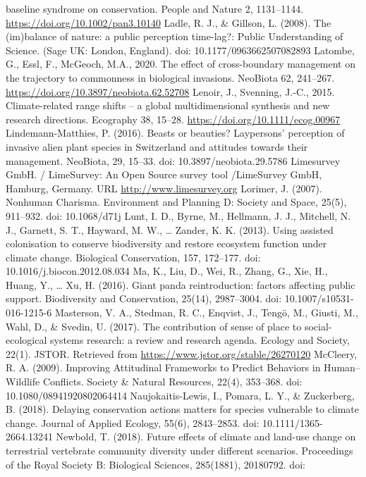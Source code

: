 \documentclass[
]{article}
\begin{document}
baseline syndrome on conservation. People and Nature 2, 1131--1144.
\url{https://doi.org/10.1002/pan3.10140} Ladle, R. J., \& Gillson, L.
(2008). The (im)balance of nature: a public perception time-lag?: Public
Understanding of Science. (Sage UK: London, England). doi:
10.1177/0963662507082893 Latombe, G., Essl, F., McGeoch, M.A., 2020. The
effect of cross-boundary management on the trajectory to commonness in
biological invasions. NeoBiota 62, 241--267.
\url{https://doi.org/10.3897/neobiota.62.52708} Lenoir, J., Svenning,
J.-C., 2015. Climate-related range shifts -- a global multidimensional
synthesis and new research directions. Ecography 38, 15--28.
\url{https://doi.org/10.1111/ecog.00967} Lindemann-Matthies, P. (2016).
Beasts or beauties? Laypersons' perception of invasive alien plant
species in Switzerland and attitudes towards their management. NeoBiota,
29, 15--33. doi: 10.3897/neobiota.29.5786 Limesurvey GmbH. / LimeSurvey:
An Open Source survey tool /LimeSurvey GmbH, Hamburg, Germany. URL
\url{http://www.limesurvey.org} Lorimer, J. (2007). Nonhuman Charisma.
Environment and Planning D: Society and Space, 25(5), 911--932. doi:
10.1068/d71j Lunt, I. D., Byrne, M., Hellmann, J. J., Mitchell, N. J.,
Garnett, S. T., Hayward, M. W., \ldots{} Zander, K. K. (2013). Using
assisted colonisation to conserve biodiversity and restore ecosystem
function under climate change. Biological Conservation, 157, 172--177.
doi: 10.1016/j.biocon.2012.08.034 Ma, K., Liu, D., Wei, R., Zhang, G.,
Xie, H., Huang, Y., \ldots{} Xu, H. (2016). Giant panda reintroduction:
factors affecting public support. Biodiversity and Conservation, 25(14),
2987--3004. doi: 10.1007/s10531-016-1215-6 Masterson, V. A., Stedman, R.
C., Enqvist, J., Tengö, M., Giusti, M., Wahl, D., \& Svedin, U. (2017).
The contribution of sense of place to social-ecological systems
research: a review and research agenda. Ecology and Society, 22(1).
JSTOR. Retrieved from \url{https://www.jstor.org/stable/26270120}
McCleery, R. A. (2009). Improving Attitudinal Frameworks to Predict
Behaviors in Human--Wildlife Conflicts. Society \& Natural Resources,
22(4), 353--368. doi: 10.1080/08941920802064414 Naujokaitis-Lewis, I.,
Pomara, L. Y., \& Zuckerberg, B. (2018). Delaying conservation actions
matters for species vulnerable to climate change. Journal of Applied
Ecology, 55(6), 2843--2853. doi: 10.1111/1365-2664.13241 Newbold, T.
(2018). Future effects of climate and land-use change on terrestrial
vertebrate community diversity under different scenarios. Proceedings of
the Royal Society B: Biological Sciences, 285(1881), 20180792. doi:
\end{document}
